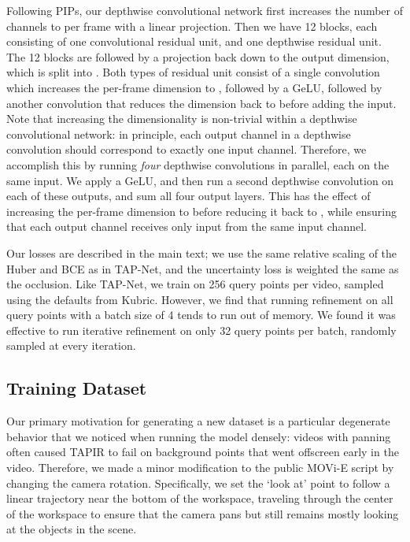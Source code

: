 \documentclass[10pt,twocolumn,letterpaper]{article}
\begin{document}
Following PIPs, our depthwise convolutional network first increases the number of channels to  per frame with a linear projection.  Then we have 12 blocks, each consisting of one  convolutional residual unit, and one depthwise residual unit.  The 12 blocks are followed by a projection back down to the output dimension, which is split into .  Both types of residual unit consist of a single convolution which increases the per-frame dimension to , followed by a GeLU, followed by another convolution that reduces the dimension back to  before adding the input.  Note that increasing the dimensionality is non-trivial within a depthwise convolutional network: in principle, each output channel in a depthwise convolution should correspond to exactly one input channel.  Therefore, we accomplish this by running \emph{four} depthwise convolutions in parallel, each on the same input.  We apply a GeLU, and then run a second depthwise convolution on each of these outputs, and sum all four output layers.  This has the effect of increasing the per-frame dimension to  before reducing it back to , while ensuring that each output channel receives only input from the same input channel.  

Our losses are described in the main text; we use the same relative scaling of the Huber and BCE as in TAP-Net, and the uncertainty loss is weighted the same as the occlusion.  Like TAP-Net, we train on 256 query points per video, sampled using the defaults from Kubric.  However, we find that running refinement on all query points with a batch size of 4 tends to run out of memory.  We found it was effective to run iterative refinement on only 32 query points per batch, randomly sampled at every iteration. 

\subsection{Training Dataset}
\label{sec:training_dataset}
Our primary motivation for generating a new dataset is a particular degenerate behavior that we noticed when running the model densely: videos with panning often caused TAPIR to fail on background points that went offscreen early in the video.  Therefore, we made a minor modification to the public MOVi-E script by changing the camera rotation.  Specifically, we set the `look at' point to follow a linear trajectory near the bottom of the workspace, traveling through the center of the workspace to ensure that the camera pans but still remains mostly looking at the objects in the scene.
\end{document}
